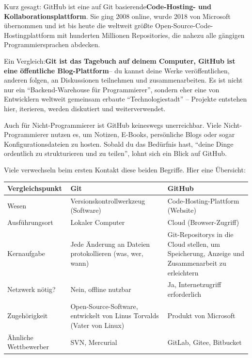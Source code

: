 


Kurz gesagt: GitHub ist eine auf Git basierende\textbf{Code-Hosting- und Kollaborationsplattform}. Sie ging 2008 online, wurde 2018 von Microsoft übernommen und ist bis heute die weltweit größte Open-Source-Code-Hostingplattform mit hunderten Millionen Repositories, die nahezu alle gängigen Programmiersprachen abdecken.

Ein Vergleich:\textbf{Git ist das Tagebuch auf deinem Computer, GitHub ist eine öffentliche Blog-Plattform}– du kannst deine Werke veröffentlichen, anderen folgen, an Diskussionen teilnehmen und zusammenarbeiten. Es ist nicht nur ein “Backend-Warehouse für Programmierer”, sondern eher eine von Entwicklern weltweit gemeinsam erbaute “Technologiestadt” – Projekte entstehen hier, iterieren, werden diskutiert und weiterverwendet.

Auch für Nicht-Programmierer ist GitHub keineswegs unerreichbar. Viele Nicht-Programmierer nutzen es, um Notizen, E-Books, persönliche Blogs oder sogar Konfigurationsdateien zu hosten. Sobald du das Bedürfnis hast, “deine Dinge ordentlich zu strukturieren und zu teilen”, lohnt sich ein Blick auf GitHub.


Viele verwechseln beim ersten Kontakt diese beiden Begriffe. Hier eine Übersicht:

\begin{center}
\begin{tabularx}{\linewidth}{|X|X|X|}
\hline
\textbf{Vergleichspunkt} & \textbf{Git} & \textbf{GitHub} \tabularnewline
\hline
Wesen & Versionskontrollwerkzeug (Software) & Code-Hosting-Plattform (Website) \tabularnewline
Ausführungsort & Lokaler Computer & Cloud (Browser-Zugriff) \tabularnewline
Kernaufgabe & Jede Änderung an Dateien protokollieren (was, wer, wann) & Git-Repositorys in die Cloud stellen, um Speicherung, Anzeige und Zusammenarbeit zu erleichtern \tabularnewline
Netzwerk nötig? & Nein, offline nutzbar & Ja, Internetzugriff erforderlich \tabularnewline
Zugehörigkeit & Open-Source-Software, entwickelt von Linus Torvalds (Vater von Linux) & Produkt von Microsoft \tabularnewline
Ähnliche Wettbewerber & SVN, Mercurial & GitLab, Gitee, Bitbucket \tabularnewline
\hline
\end{tabularx}
\end{center}

